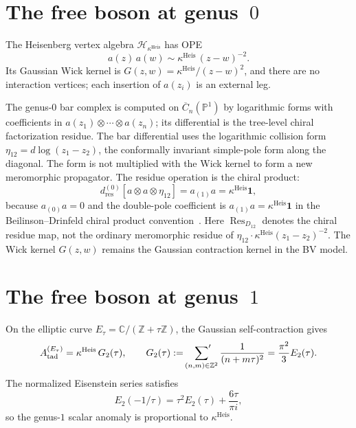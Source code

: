 \section{The free boson at genus~\texorpdfstring{$0$}{0}}

The Heisenberg vertex algebra $\mathcal{H}_{\kappa^{\mathrm{Heis}}}$
has OPE
\[
a(z)\,a(w) \sim \kappa^{\mathrm{Heis}}\,(z-w)^{-2}.
\]
Its Gaussian Wick kernel is
$G(z,w)=\kappa^{\mathrm{Heis}}/(z-w)^2$, and there are no interaction
vertices; each insertion of $a(z_i)$ is an external leg.

\begin{center}
\end{center}

The genus-$0$ bar complex is computed on
$\overline{C}_n(\mathbb{P}^1)$ by logarithmic forms with coefficients
in $a(z_1)\otimes\cdots\otimes a(z_n)$; its differential is the
tree-level chiral factorization residue.  The bar differential uses
the logarithmic collision form
$\eta_{12}=d\log(z_1-z_2)$, the conformally invariant simple-pole
form along the diagonal.  The form
is not multiplied with the Wick kernel to form a new meromorphic
propagator.  The residue operation is the chiral product:
\begin{equation}\label{eq:heisenberg-bar-residue-vol2}
d^{(0)}_{\mathrm{res}}[a\otimes a\otimes\eta_{12}]
= a_{(1)}a
= \kappa^{\mathrm{Heis}}\mathbf{1},
\end{equation}
because $a_{(0)}a=0$ and the double-pole coefficient is
$a_{(1)}a=\kappa^{\mathrm{Heis}}\mathbf{1}$ in the
Beilinson--Drinfeld chiral product convention~\cite[\S3.4]{BD04}.
Here
$\operatorname{Res}_{D_{12}}$ denotes the chiral residue map, not the
ordinary meromorphic residue of
$\eta_{12}\cdot\kappa^{\mathrm{Heis}}(z_1-z_2)^{-2}$.  The Wick kernel
$G(z,w)$ remains the Gaussian contraction kernel in the BV model.

\section{The free boson at genus~\texorpdfstring{$1$}{1}}

On the elliptic curve
$E_\tau=\mathbb{C}/(\mathbb{Z}+\tau\mathbb{Z})$, the Gaussian
self-contraction gives
\begin{equation}\label{eq:heisenberg-tadpole-vol2}
A_{\mathrm{tad}}^{(E_\tau)}
= \kappa^{\mathrm{Heis}}\,G_2(\tau),\qquad
G_2(\tau):=\sideset{}{'}\sum_{(n,m)\in\mathbb{Z}^2}
\frac{1}{(n+m\tau)^2}
= \frac{\pi^2}{3}E_2(\tau).
\end{equation}
The normalized Eisenstein series satisfies
\[
E_2(-1/\tau)=\tau^2E_2(\tau)+\frac{6\tau}{\pi i},
\]
so the genus-$1$ scalar anomaly is proportional to
$\kappa^{\mathrm{Heis}}$.

